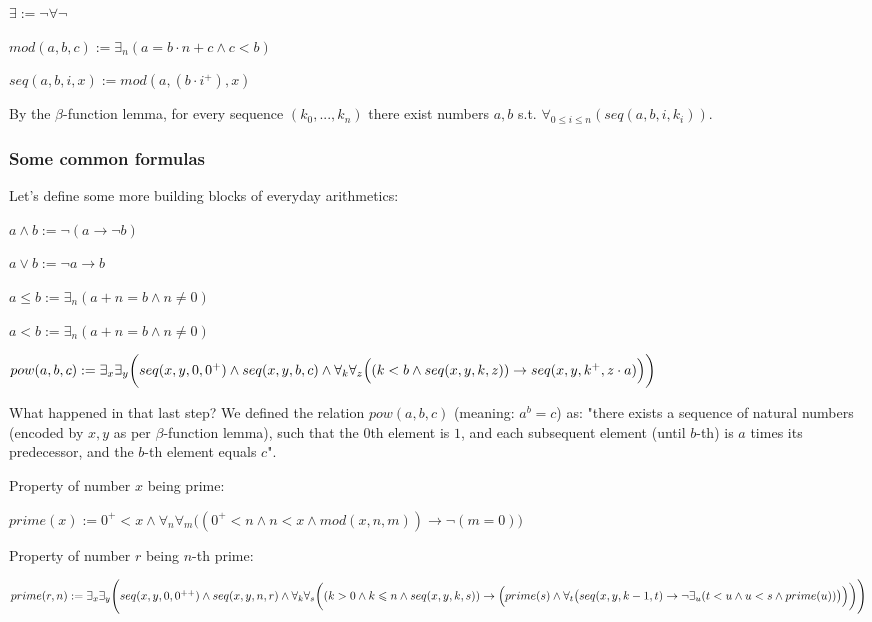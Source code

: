 \documentclass{article}
\begin{document}
\begin{center}
    $\exists := \neg \forall \neg$

    $mod(a, b, c) := \exists_n (a = b \cdot n + c \land c < b)$
    
    $seq(a, b, i, x) := mod(a, (b \cdot i^+), x)$
\end{center}

By the $\beta$-function lemma, for every sequence $(k_0, ..., k_n)$ there exist numbers $a, b$ s.t.
$\forall_{0 \leqslant i \leqslant n}(seq(a, b, i, k_i))$.

\subsubsection{Some common formulas}

Let's define some more building blocks of everyday arithmetics:

\begin{center}
    $a \land b := \neg(a \rightarrow \neg b)$

    $a \lor b := \neg a \rightarrow b$
    
    $a \leqslant b := \exists_n (a + n = b \land n \neq 0)$
    
    $a < b := \exists_n (a + n = b \land n \neq 0)$

    $ pow(a, b, c) := \exists_x \exists_y \biggl(
        seq(x, y, 0, 0^+) \land seq(x, y, b, c) \land
        \forall_k \forall_z \Bigl(
            (k < b \land seq(x, y, k, z))
            \rightarrow
            seq(x, y, k^+, z \cdot a)
        \Bigl)
    \biggl) $
\end{center}

What happened in that last step? We defined the relation $pow(a, b, c)$ (meaning: $a^b = c$)
as: "there exists a sequence of natural numbers (encoded by $x, y$ as per $\beta$-function
lemma), such that the $0$th element is $1$, and each subsequent element (until $b$-th) is
$a$ times its predecessor, and the $b$-th element equals $c$".

Property of number $x$ being prime:

\begin{center}
    $prime(x) := 0^+ < x \land \forall_n \forall_m \bigl(
        (0^+ < n \land n < x \land mod(x, n, m)) \rightarrow \neg (m = 0)
    \bigl)$
\end{center}

Property of number $r$ being $n$-th prime:

\begin{center}
    $prime(r, n) := \exists_x \exists_y \Biggl(
        seq(x, y, 0, 0^{++}) \land seq(x, y, n, r) \land
        \forall_k \forall_s \biggl(
            (k > 0 \land k \leqslant n \land seq(x, y, k, s))
            \rightarrow
            \Bigl(
                prime(s) \land \forall_t \bigl(
                    seq(x, y, k-1, t)
                    \rightarrow
                    \neg \exists_u (t < u \land u < s \land prime(u))
                \bigl)
            \Bigl)
        \biggl)
    \Biggl)$
\end{center}
\end{document}

